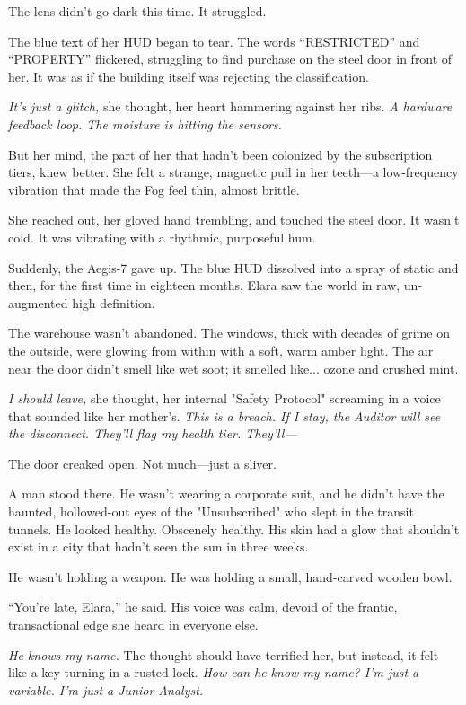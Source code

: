 The lens didn't go dark this time. It struggled.

The blue text of her HUD began to tear. The words ``RESTRICTED'' and ``PROPERTY'' flickered, struggling to find purchase on the steel door in front of her. It was as if the building itself was rejecting the classification. 

\textit{It’s just a glitch,} she thought, her heart hammering against her ribs. \textit{A hardware feedback loop. The moisture is hitting the sensors.} 

But her mind, the part of her that hadn't been colonized by the subscription tiers, knew better. She felt a strange, magnetic pull in her teeth—a low-frequency vibration that made the Fog feel thin, almost brittle.



She reached out, her gloved hand trembling, and touched the steel door. It wasn't cold. It was vibrating with a rhythmic, purposeful hum. 

Suddenly, the Aegis-7 gave up. The blue HUD dissolved into a spray of static and then, for the first time in eighteen months, Elara saw the world in raw, un-augmented high definition. 

The warehouse wasn't abandoned. The windows, thick with decades of grime on the outside, were glowing from within with a soft, warm amber light. The air near the door didn't smell like wet soot; it smelled like... ozone and crushed mint.

\textit{I should leave,} she thought, her internal "Safety Protocol" screaming in a voice that sounded like her mother's. \textit{This is a breach. If I stay, the Auditor will see the disconnect. They’ll flag my health tier. They’ll—}

The door creaked open. Not much—just a sliver. 

A man stood there. He wasn't wearing a corporate suit, and he didn't have the haunted, hollowed-out eyes of the "Unsubscribed" who slept in the transit tunnels. He looked healthy. Obscenely healthy. His skin had a glow that shouldn't exist in a city that hadn't seen the sun in three weeks.

He wasn't holding a weapon. He was holding a small, hand-carved wooden bowl.

``You're late, Elara,'' he said. His voice was calm, devoid of the frantic, transactional edge she heard in everyone else. 

\textit{He knows my name.} The thought should have terrified her, but instead, it felt like a key turning in a rusted lock. \textit{How can he know my name? I'm just a variable. I'm just a Junior Analyst.}

